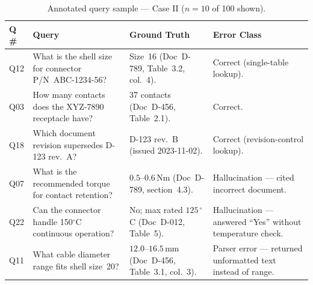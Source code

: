 \begin{table}[htbp]
    \captionsetup{skip=5pt}
    \caption{Annotated query sample — Case II ($n = 10$ of 100 shown).}
    \label{tab:qs_saab}
    \centering
    \small
    \setlength{\tabcolsep}{4pt}
    \renewcommand{\arraystretch}{1}
    \begin{tabularx}{\textwidth}{p{} p{} p{} p{}}
        \toprule
        \textbf{Q\,\#} & \textbf{Query} & \textbf{Ground Truth} & \textbf{Error Class} \\
        \midrule
        Q12 &
        What is the shell size for connector P/N~ABC-1234-56? &
        Size~16 (Doc~D-789, Table~3.2, col.~4). &
        Correct (single-table lookup). \\
        
        \addlinespace
        
        Q03 &
        How many contacts does the XYZ-7890 receptacle have? &
        37 contacts (Doc~D-456, Table~2.1). &
        Correct. \\
        
        \addlinespace
        
        Q18 &
        Which document revision supersedes D-123 rev.~A? &
        D-123 rev.~B (issued 2023-11-02). &
        Correct (revision-control lookup). \\
        
        \addlinespace
        
        Q07 &
        What is the recommended torque for contact retention? &
        $0.5$--$0.6\,\text{Nm}$ (Doc~D-789, section~4.3). &
        Hallucination — cited incorrect document. \\
        
        \addlinespace
        
        Q22 &
        Can the connector handle 150$^{\circ}$C continuous operation? &
        No; max rated $125\,^{\circ}$C (Doc~D-012, Table~5). &
        Hallucination — answered ``Yes'' without temperature check. \\
        
        \addlinespace
        
        Q11 &
        What cable diameter range fits shell size~20? &
        $12.0$--$16.5\,\text{mm}$ (Doc~D-456, Table~3.1, col.~3). &
        Parser error — returned unformatted text instead of range. \\
        

\end{tabularx}
\end{table}

